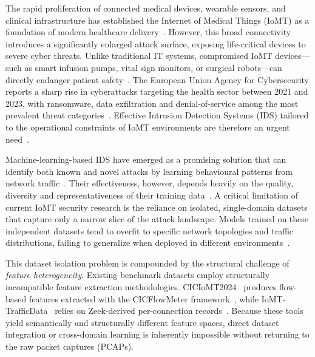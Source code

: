 \documentclass[runningheads]{llncs}
\begin{document}
The rapid proliferation of connected medical devices, wearable sensors, and clinical infrastructure has established the Internet of Medical Things (IoMT) as a foundation of modern healthcare delivery~\cite{dimitrov2016medical}. However, this broad connectivity introduces a significantly enlarged attack surface, exposing life-critical devices to severe cyber threats. Unlike traditional IT systems, compromised IoMT devices---such as smart infusion pumps, vital sign monitors, or surgical robots---can directly endanger patient safety~\cite{domenech2024ensuring}. The European Union Agency for Cybersecurity reports a sharp rise in cyberattacks targeting the health sector between 2021 and 2023, with ransomware, data exfiltration and denial-of-service among the most prevalent threat categories~\cite{enisa2023health}. Effective Intrusion Detection Systems (IDS) tailored to the operational constraints of IoMT environments are therefore an urgent need~\cite{domenech2024ensuring}.

Machine-learning-based IDS have emerged as a promising solution that can identify both known and novel attacks by learning behavioural patterns from network traffic~\cite{ahmad2021network}. Their effectiveness, however, depends heavily on the quality, diversity and representativeness of their training data~\cite{khraisat2019survey,Domenech2026}. A critical limitation of current IoMT security research is the reliance on isolated, single-domain datasets that capture only a narrow slice of the attack landscape. Models trained on these independent datasets tend to overfit to specific network topologies and traffic distributions, failing to generalize when deployed in different environments~\cite{domenech2025evaluating,heidari2023iot}.

This dataset isolation problem is compounded by the structural challenge of \emph{feature heterogeneity}. Existing benchmark datasets employ structurally incompatible feature extraction methodologies. CICIoMT2024~\cite{dadkhah2024ciciomt} produces flow-based features extracted with the CICFlowMeter framework~\cite{cicflowmeter}, while IoMT-TrafficData~\cite{areia2024iomt} relies on Zeek-derived per-connection records~\cite{zeek}. Because these tools yield semantically and structurally different feature spaces, direct dataset integration or cross-domain learning is inherently impossible without returning to the raw packet captures (PCAPs).
\end{document}
